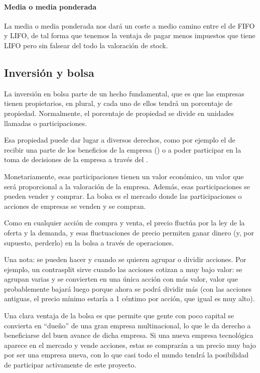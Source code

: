 \documentclass[nochap,palatino,shortheader]{apuntes}
\begin{document}
\paragraph{Media o media ponderada} La media o media ponderada nos dará un coste a medio camino entre el de FIFO y LIFO, de tal forma que tenemos la ventaja de pagar menos impuestos que tiene LIFO pero sin falsear del todo la valoración de stock.

\subsection{Inversión y bolsa}

La inversión en bolsa parte de un hecho fundamental, que es que las empresas tienen propietarios, en plural, y cada uno de ellos tendrá un porcentaje de propiedad. Normalmente, el porcentaje de propiedad se divide en unidades llamadas  o participaciones.

Esa propiedad puede dar lugar a diversos derechos, como por ejemplo el de recibir una parte de los beneficios de la empresa () o a poder participar en la toma de decisiones de la empresa a través del .

Monetariamente, esas participaciones tienen un valor económico, un valor que será proporcional a la valoración de la empresa. Además, esas participaciones se pueden vender y comprar. La bolsa es el mercado donde las participaciones o acciones de empresas se venden y se compran.

Como en cualquier acción de compra y venta, el precio fluctúa por la ley de la oferta y la demanda, y esas fluctuaciones de precio permiten ganar dinero (y, por supuesto, perderlo) en la bolsa a través de operaciones.

Una nota: se pueden hacer  y  cuando se quieren agrupar o dividir acciones. Por ejemplo, un contrasplit sirve cuando las acciones cotizan a muy bajo valor: se agrupan varias y se convierten en una única acción con más valor, valor que probablemente bajará luego porque ahora se podrá dividir más (con las acciones antiguas, el precio mínimo estaría a 1 céntimo por acción, que igual es muy alto).

Una clara ventaja de la bolsa es que permite que gente con poco capital se convierta en ``dueño'' de una gran empresa multinacional, lo que le da derecho a beneficiarse del buen avance de dicha empresa. Si una nueva empresa tecnológica aparece en el mercado y vende acciones, estas se comprarán a un precio muy bajo por ser una empresa nueva, con lo que casi todo el mundo tendrá la posibilidad de participar activamente de este proyecto.
\end{document}
